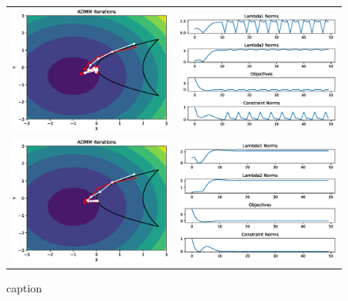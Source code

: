 \documentclass{article}
\begin{document}
\begin{figure}
\begin{tabular}{cc}
  \includegraphics[width=80mm]{figures/toy_admm_iterations_1.eps} &   \includegraphics[width=80mm]{figures/toy_admm_norms_1.eps} \\
 \includegraphics[width=85mm]{figures/toy_ali_iterations_1.eps} &   \includegraphics[width=85mm]{figures/toy_ali_norms_1.eps} \\
\end{tabular}
\caption{caption}
\label{fig:quad_trajectories}
\end{figure}
\end{document}
